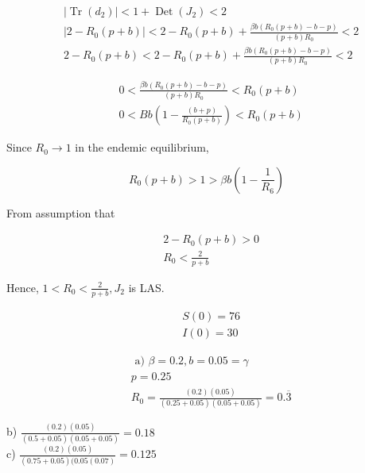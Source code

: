 \documentclass[10pt]{article}
\begin{document}
$$
\begin{aligned}
& \left|\operatorname{Tr}\left(d_{2}\right)\right|<1+\operatorname{Det}\left(J_{2}\right)<2 \\
& \left|2-R_{0}(p+b)\right|<2-R_{0}(p+b)+\frac{\beta b\left(R_{0}(p+b)-b-p\right)}{(p+b) R_{0}}<2 \\
& 2-R_{0}(p+b)<2-R_{0}(p+b)+\frac{\beta b\left(R_{0}(p+b)-b-p\right)}{(p+b) R_{0}}<2
\end{aligned}
$$

$$
\begin{aligned}
& 0<\frac{\beta b\left(R_{0}(p+b)-b-p\right)}{(p+b) R_{0}}<R_{0}(p+b) \\
& 0<B b\left(1-\frac{(b+p)}{R_{0}(p+b)}\right)<R_{0}(p+b)
\end{aligned}
$$

Since $R_{0} \rightarrow 1$ in the endemic equilibrium,

$$
R_{0}(p+b)>1>\beta b\left(1-\frac{1}{R_{6}}\right)
$$

From assumption that

$$
\begin{aligned}
& 2-R_{0}(p+b)>0 \\
& R_{0}<\frac{2}{p+b}
\end{aligned}
$$

Hence, $1<R_{0}<\frac{2}{p+b}, J_{2}$ is LAS.

$$
\begin{aligned}
& S(0)=76 \\
& I(0)=30
\end{aligned}
$$

$$
\begin{aligned}
& \text { a) } \beta=0.2, b=0.05=\gamma \\
& p=0.25 \\
& R_{0}=\frac{(0.2)(0.05)}{(0.25+0.05)(0.05+0.05)}=0 . \overline{3}
\end{aligned}
$$

b) $\frac{(0.2)(0.05)}{(0.5+0.05)(0.05+0.05)}=0.18$\\
c) $\frac{(0.2)(0.05)}{(0.75+0.05)(0.05(0.07)}=0.125$
\end{document}
